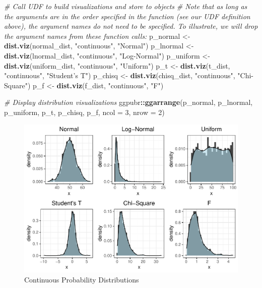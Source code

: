 \documentclass[]{book}
\newenvironment{Shaded}{\begin{snugshade}}{\end{snugshade}}
\newcommand{\CommentTok}[1]{\textcolor[rgb]{0.56,0.35,0.01}{\textit{#1}}}
\newcommand{\DataTypeTok}[1]{\textcolor[rgb]{0.13,0.29,0.53}{#1}}
\newcommand{\DecValTok}[1]{\textcolor[rgb]{0.00,0.00,0.81}{#1}}
\newcommand{\KeywordTok}[1]{\textcolor[rgb]{0.13,0.29,0.53}{\textbf{#1}}}
\newcommand{\NormalTok}[1]{#1}
\newcommand{\OperatorTok}[1]{\textcolor[rgb]{0.81,0.36,0.00}{\textbf{#1}}}
\newcommand{\StringTok}[1]{\textcolor[rgb]{0.31,0.60,0.02}{#1}}
\begin{document}
\begin{Shaded}
\begin{Highlighting}[]
\CommentTok{# Call UDF to build visualizations and store to objects}
\CommentTok{# Note that as long as the arguments are in the order specified in the function (see our UDF definition above), the argument names do not need to be specified. To illustrate, we will drop the argument names from these function calls:}
\NormalTok{p_normal <-}\StringTok{ }\KeywordTok{dist.viz}\NormalTok{(normal_dist, }\StringTok{"continuous"}\NormalTok{, }\StringTok{"Normal"}\NormalTok{)}
\NormalTok{p_lnormal <-}\StringTok{ }\KeywordTok{dist.viz}\NormalTok{(lnormal_dist, }\StringTok{"continuous"}\NormalTok{, }\StringTok{"Log-Normal"}\NormalTok{)}
\NormalTok{p_uniform <-}\StringTok{ }\KeywordTok{dist.viz}\NormalTok{(uniform_dist, }\StringTok{"continuous"}\NormalTok{, }\StringTok{"Uniform"}\NormalTok{)}
\NormalTok{p_t <-}\StringTok{ }\KeywordTok{dist.viz}\NormalTok{(t_dist, }\StringTok{"continuous"}\NormalTok{, }\StringTok{"Student's T"}\NormalTok{)}
\NormalTok{p_chisq <-}\StringTok{ }\KeywordTok{dist.viz}\NormalTok{(chisq_dist, }\StringTok{"continuous"}\NormalTok{, }\StringTok{"Chi-Square"}\NormalTok{)}
\NormalTok{p_f <-}\StringTok{ }\KeywordTok{dist.viz}\NormalTok{(f_dist, }\StringTok{"continuous"}\NormalTok{, }\StringTok{"F"}\NormalTok{)}

\CommentTok{# Display distribution visualizations}
\NormalTok{ggpubr}\OperatorTok{::}\KeywordTok{ggarrange}\NormalTok{(p_normal, p_lnormal, p_uniform, p_t, p_chisq, p_f,}
          \DataTypeTok{ncol =} \DecValTok{3}\NormalTok{, }\DataTypeTok{nrow =} \DecValTok{2}\NormalTok{)}
\end{Highlighting}
\end{Shaded}

\begin{figure}

{\centering \includegraphics{The_People_Analytics_Companion_files/figure-latex/continous-dist-1} 

}

\caption{Continuous Probability Distributions}\label{fig:continous-dist}
\end{figure}
\end{document}
